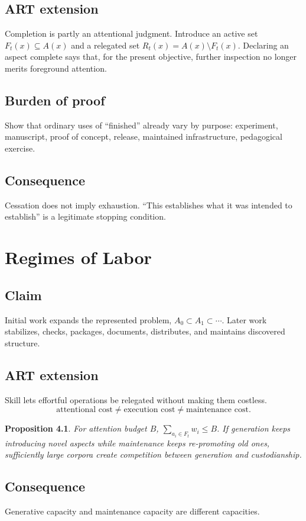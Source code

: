\documentclass[11pt,openany]{book}
\newtheorem{proposition}{Proposition}[chapter]
\begin{document}
\section{ART extension}
Completion is partly an attentional judgment. Introduce an active set
$F_t(x)\subseteq A(x)$ and a relegated set $R_t(x)=A(x)\setminus F_t(x)$.
Declaring an aspect complete says that, for the present objective, further
inspection no longer merits foreground attention.
\section{Burden of proof}
Show that ordinary uses of ``finished'' already vary by purpose:
experiment, manuscript, proof of concept, release, maintained
infrastructure, pedagogical exercise.
\section{Consequence}
Cessation does not imply exhaustion. ``This establishes what it was
intended to establish'' is a legitimate stopping condition.

\chapter{Regimes of Labor}
\section{Claim}
Initial work expands the represented problem, $A_0\subset A_1\subset\cdots$.
Later work stabilizes, checks, packages, documents, distributes, and
maintains discovered structure.
\section{ART extension}
Skill lets effortful operations be relegated without making them costless.
\[
  \text{attentional cost}\neq\text{execution cost}\neq\text{maintenance cost}.
\]
\begin{proposition}
For attention budget $B$, $\sum_{a_i\in F_t} w_i\le B$. If generation keeps
introducing novel aspects while maintenance keeps re-promoting old ones,
sufficiently large corpora create competition between generation and
custodianship.
\end{proposition}
\section{Consequence}
Generative capacity and maintenance capacity are different capacities.
\end{document}
